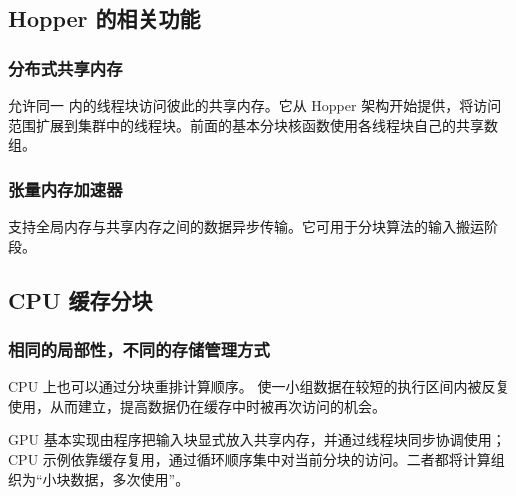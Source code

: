 \subsection{Hopper 的相关功能}
\subsubsection{分布式共享内存}
 允许同一 内的线程块访问彼此的共享内存。它从 Hopper 架构开始提供，将访问范围扩展到集群中的线程块。前面的基本分块核函数使用各线程块自己的共享数组。

\subsubsection{张量内存加速器}
 支持全局内存与共享内存之间的数据异步传输。它可用于分块算法的输入搬运阶段。

\subsection{CPU 缓存分块}
\subsubsection{相同的局部性，不同的存储管理方式}
CPU 上也可以通过分块重排计算顺序。 使一小组数据在较短的执行区间内被反复使用，从而建立，提高数据仍在缓存中时被再次访问的机会。

GPU 基本实现由程序把输入块显式放入共享内存，并通过线程块同步协调使用；CPU 示例依靠缓存复用，通过循环顺序集中对当前分块的访问。二者都将计算组织为“小块数据，多次使用”。

